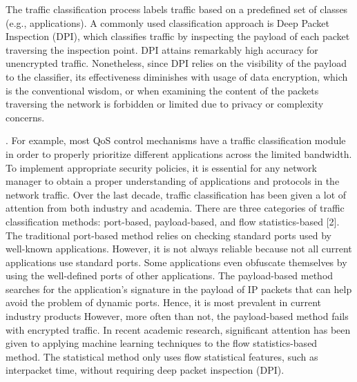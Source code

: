 \documentclass[10pt,journal,compsoc]{IEEEtran}
\begin{document}
The traffic classification process labels traffic based on a
predefined set of classes (e.g., applications). A commonly
used classification approach is Deep Packet Inspection (DPI),
which classifies traffic by inspecting the payload of each
packet traversing the inspection point. DPI attains remarkably
high accuracy for unencrypted traffic. Nonetheless, since DPI
relies on the visibility of the payload to the classifier, its
effectiveness diminishes with usage of data encryption, which
is the conventional wisdom, or when examining the content
of the packets traversing the network is forbidden or limited
due to privacy or complexity concerns.

%
%
%
%

\cite{Zhang2014}
. For example,
most QoS control mechanisms have a traffic classification
module in order to properly prioritize different applications
across the limited bandwidth. To implement appropriate security policies, it is essential for any network manager to obtain
a proper understanding of applications and protocols in the
network traffic. Over the last decade, traffic classification has
been given a lot of attention from both industry and academia.
There are three categories of traffic classification methods:
port-based, payload-based, and flow statistics-based [2]. The
traditional port-based method relies on checking standard ports
used by well-known applications. However, it is not always
reliable because not all current applications use standard ports.
Some applications even obfuscate themselves by using the
well-defined ports of other applications. The payload-based
method searches for the application's signature in the payload
of IP packets that can help avoid the problem of dynamic
ports. Hence, it is most prevalent in current industry products However, more often than not, the payload-based method fails
with encrypted traffic. In recent academic research, significant attention has been given to applying machine learning
techniques to the flow statistics-based method. The statistical
method only uses flow statistical features, such as interpacket
time, without requiring deep packet inspection (DPI).
\end{document}
